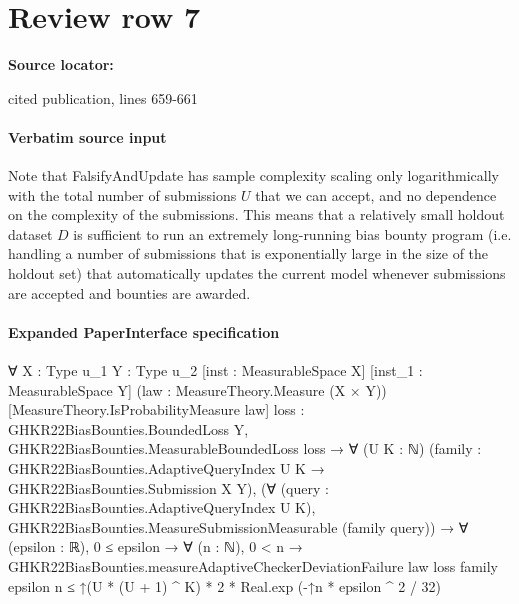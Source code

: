 \documentclass[10pt]{article}
\begin{document}
\section*{Review row 7}
\textbf{Source locator:} {\footnotesize\raggedright cited publication, lines 659-\allowbreak{}661\par}
\paragraph{Verbatim source input}
\begin{ReviewVerbatim}
\begin{remark}
Note that FalsifyAndUpdate has sample complexity scaling only logarithmically with the total number of submissions $U$ that we can accept, and no dependence on the complexity of the submissions. This means that a relatively small holdout dataset $D$ is sufficient to run an extremely long-running bias bounty program (i.e. handling a number of submissions that is exponentially large in the size of the holdout set) that automatically updates the current model whenever submissions are accepted and bounties are awarded.
\end{remark}
\end{ReviewVerbatim}



\paragraph{Expanded PaperInterface specification}
\begin{ReviewVerbatim}
∀ {X : Type u_1} {Y : Type u_2} [inst : MeasurableSpace X] [inst_1 : MeasurableSpace Y]
  (law : MeasureTheory.Measure (X × Y)) [MeasureTheory.IsProbabilityMeasure law]
  {loss : GHKR22BiasBounties.BoundedLoss Y},
  GHKR22BiasBounties.MeasurableBoundedLoss loss →
    ∀ (U K : ℕ) (family : GHKR22BiasBounties.AdaptiveQueryIndex U K → GHKR22BiasBounties.Submission X Y),
      (∀ (query : GHKR22BiasBounties.AdaptiveQueryIndex U K),
          GHKR22BiasBounties.MeasureSubmissionMeasurable (family query)) →
        ∀ (epsilon : ℝ),
          0 ≤ epsilon →
            ∀ (n : ℕ),
              0 < n →
                GHKR22BiasBounties.measureAdaptiveCheckerDeviationFailure law loss family epsilon n ≤
                  ↑(U * (U + 1) ^ K) * 2 * Real.exp (-↑n * epsilon ^ 2 / 32)
\end{ReviewVerbatim}
\end{document}
